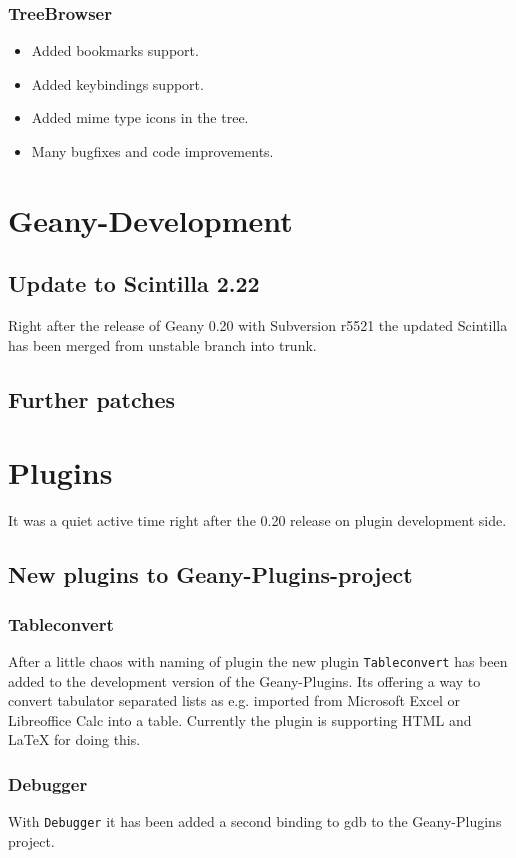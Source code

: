 \documentclass[%
paper=a4,%
fontsize=11pt,%
twoside=false,%
DIV18,
headsepline,
plainheadsepline,
footsepline,
plainfootsepline,
parskip=half,%
openany,%
]{scrartcl}
\begin{document}
\subsubsection{TreeBrowser}
\begin{itemize}
	\item Added bookmarks support.
	\item Added keybindings support.
	\item Added mime type icons in the tree.
	\item Many bugfixes and code improvements.
\end{itemize}

\section{Geany-Development}
\subsection{Update to Scintilla 2.22}

Right after the release of Geany 0.20 with Subversion r5521 the
updated Scintilla has been merged from unstable branch into trunk.

\subsection{Further patches}

\section{Plugins}

It was a quiet active time right after the 0.20 release on plugin
development side.

\subsection{New plugins to Geany-Plugins-project}
\subsubsection{Tableconvert}

After a little chaos with naming of plugin the new plugin \texttt{Tableconvert}
has been added to the development version of the Geany-Plugins. Its
offering a way to convert tabulator separated lists as e.g. imported
from Microsoft Excel or Libreoffice Calc into a table. Currently the
plugin is supporting HTML and \LaTeX{} for doing this.

\subsubsection{Debugger}

With \texttt{Debugger} it has been added a second binding to gdb to
the Geany-Plugins project.
\end{document}
